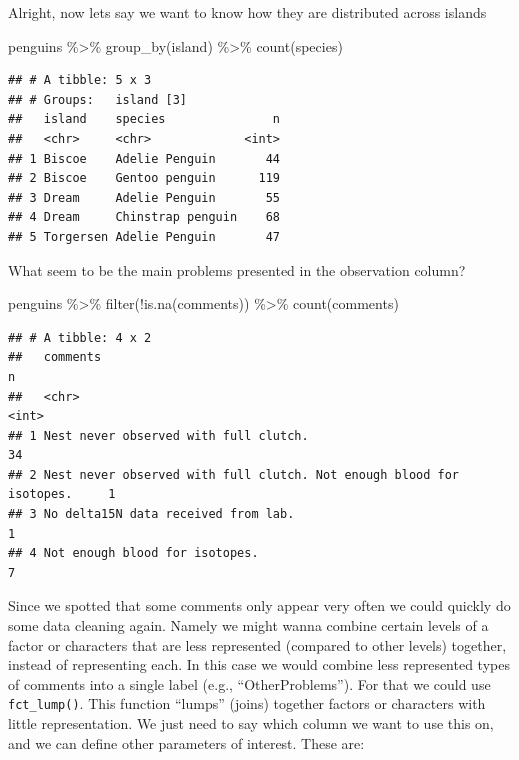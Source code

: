 \documentclass[
]{book}
\newenvironment{Shaded}{\begin{snugshade}}{\end{snugshade}}
\newcommand{\FunctionTok}[1]{\textcolor[rgb]{0.00,0.00,0.00}{#1}}
\newcommand{\NormalTok}[1]{#1}
\newcommand{\SpecialCharTok}[1]{\textcolor[rgb]{0.00,0.00,0.00}{#1}}
\begin{document}
Alright, now lets say we want to know how they are distributed across islands

\begin{Shaded}
\begin{Highlighting}[]
\NormalTok{penguins }\SpecialCharTok{\%\textgreater{}\%} 
  \FunctionTok{group\_by}\NormalTok{(island) }\SpecialCharTok{\%\textgreater{}\%} 
  \FunctionTok{count}\NormalTok{(species)}
\end{Highlighting}
\end{Shaded}

\begin{verbatim}
## # A tibble: 5 x 3
## # Groups:   island [3]
##   island    species               n
##   <chr>     <chr>             <int>
## 1 Biscoe    Adelie Penguin       44
## 2 Biscoe    Gentoo penguin      119
## 3 Dream     Adelie Penguin       55
## 4 Dream     Chinstrap penguin    68
## 5 Torgersen Adelie Penguin       47
\end{verbatim}

What seem to be the main problems presented in the observation column?

\begin{Shaded}
\begin{Highlighting}[]
\NormalTok{penguins }\SpecialCharTok{\%\textgreater{}\%}
  \FunctionTok{filter}\NormalTok{(}\SpecialCharTok{!}\FunctionTok{is.na}\NormalTok{(comments)) }\SpecialCharTok{\%\textgreater{}\%} 
  \FunctionTok{count}\NormalTok{(comments)}
\end{Highlighting}
\end{Shaded}

\begin{verbatim}
## # A tibble: 4 x 2
##   comments                                                                 n
##   <chr>                                                                <int>
## 1 Nest never observed with full clutch.                                   34
## 2 Nest never observed with full clutch. Not enough blood for isotopes.     1
## 3 No delta15N data received from lab.                                      1
## 4 Not enough blood for isotopes.                                           7
\end{verbatim}

Since we spotted that some comments only appear very often we could quickly do some data cleaning again.
Namely we might wanna combine certain levels of a factor or characters that are less represented (compared to other levels) together, instead of representing each. In this case we would combine less represented types of comments into a single label (e.g., ``OtherProblems'').
For that we could use \texttt{fct\_lump()}.
This function ``lumps'' (joins) together factors or characters with little representation.
We just need to say which column we want to use this on, and we can define other parameters of interest.
These are:
\end{document}
